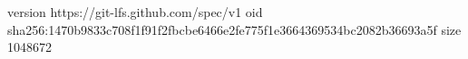 version https://git-lfs.github.com/spec/v1
oid sha256:1470b9833c708f1f91f2fbcbe6466e2fe775f1e3664369534bc2082b36693a5f
size 1048672
